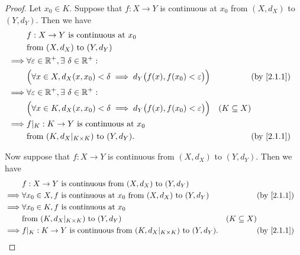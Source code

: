 \begin{proof}
  Let \(x_0 \in K\).
  Suppose that \(f : X \to Y\) is continuous at \(x_0\) from \((X, d_X)\) to \((Y, d_Y)\).
  Then we have
  \begin{align*}
             & f : X \to Y \text{ is continuous at } x_0                                                                                                     \\
             & \text{from } (X, d_X) \text{ to } (Y, d_Y)                                                                                                    \\
    \implies & \forall \varepsilon \in \R^+, \exists\ \delta \in \R^+ :                                                                                      \\
             & \Big(\forall x \in X, d_X(x, x_0) < \delta \implies d_Y\big(f(x), f(x_0) < \varepsilon\big)\Big) &                 & \text{(by \cref{2.1.1})} \\
    \implies & \forall \varepsilon \in \R^+, \exists\ \delta \in \R^+ :                                                                                      \\
             & \Big(\forall x \in K, d_X(x, x_0) < \delta \implies d_Y\big(f(x), f(x_0) < \varepsilon\big)\Big) & (K \subseteq X)                            \\
    \implies & f|_K : K \to Y \text{ is continuous at } x_0                                                                                                  \\
             & \text{from } (K, d_X|_{K \times K}) \text{ to } (Y, d_Y).                                        &                 & \text{(by \cref{2.1.1})}
  \end{align*}

  Now suppose that \(f : X \to Y\) is continuous from \((X, d_X)\) to \((Y, d_Y)\).
  Then we have
  \begin{align*}
             & f : X \to Y \text{ is continuous from } (X, d_X) \text{ to } (Y, d_Y)                                                                       \\
    \implies & \forall x_0 \in X, f \text{ is continuous at } x_0 \text{ from } (X, d_X) \text{ to } (Y, d_Y) &                 & \text{(by \cref{2.1.1})} \\
    \implies & \forall x_0 \in K, f \text{ is continuous at } x_0                                                                                          \\
             & \text{from } (K, d_X|_{K \times K}) \text{ to } (Y, d_Y)                                       & (K \subseteq X)                            \\
    \implies & f|_K : K \to Y \text{ is continuous from } (K, d_X|_{K \times K}) \text{ to } (Y, d_Y).        &                 & \text{(by \cref{2.1.1})}
  \end{align*}
\end{proof}

